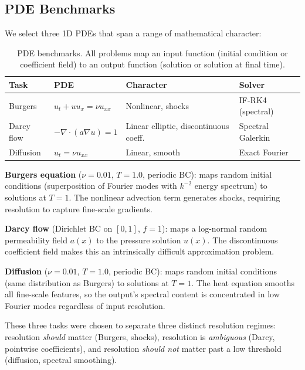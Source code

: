 \documentclass[11pt]{article}
\begin{document}
\subsection{PDE Benchmarks}
\label{sec:pdes}

We select three 1D PDEs that span a range of mathematical character:

\begin{table}[h]
\centering
\caption{PDE benchmarks. All problems map an input function
(initial condition or coefficient field) to an output function
(solution or solution at final time).}
\label{tab:tasks}
\begin{tabular}{@{}llll@{}}
\toprule
\textbf{Task} & \textbf{PDE} & \textbf{Character} &
\textbf{Solver} \\
\midrule
Burgers & $u_t + uu_x = \nu u_{xx}$ & Nonlinear, shocks &
IF-RK4 (spectral) \\
Darcy flow & $-\nabla \cdot (a \nabla u) = 1$ & Linear elliptic,
discontinuous coeff. & Spectral Galerkin \\
Diffusion & $u_t = \nu u_{xx}$ & Linear, smooth &
Exact Fourier \\
\bottomrule
\end{tabular}
\end{table}

\noindent
\textbf{Burgers equation} ($\nu = 0.01$, $T = 1.0$, periodic BC):
maps random initial conditions (superposition of Fourier modes with
$k^{-2}$ energy spectrum) to solutions at $T = 1$. The nonlinear
advection term generates shocks, requiring resolution to capture
fine-scale gradients.

\textbf{Darcy flow} (Dirichlet BC on $[0, 1]$, $f = 1$):
maps a log-normal random permeability field $a(x)$ to the pressure
solution $u(x)$. The discontinuous coefficient field makes this an
intrinsically difficult approximation problem.

\textbf{Diffusion} ($\nu = 0.01$, $T = 1.0$, periodic BC):
maps random initial conditions (same distribution as Burgers) to
solutions at $T = 1$. The heat equation smooths all fine-scale
features, so the output's spectral content is concentrated in low
Fourier modes regardless of input resolution.

These three tasks were chosen to separate three distinct resolution
regimes: resolution \emph{should} matter (Burgers, shocks),
resolution is \emph{ambiguous} (Darcy, pointwise coefficients), and
resolution \emph{should not} matter past a low threshold (diffusion,
spectral smoothing).
\end{document}
